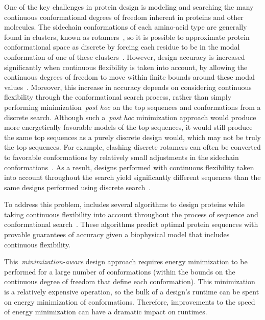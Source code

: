 One of the key challenges in protein design is modeling and searching the many continuous conformational degrees of freedom inherent in proteins and other molecules. The sidechain conformations of each amino-acid type are generally found in clusters, known as rotamers~\cite{rotamers}, so it is possible to approximate protein conformational space as discrete by forcing each residue to be in the modal conformation of one of these clusters~\cite{DEE,DEE/A*}.  However, design accuracy is increased significantly when continuous flexibility is taken into account, by allowing the continuous degrees of freedom to move within finite bounds around these modal values~\cite{iMinDEE,DEEPer,OSPREY_MIE,BBK*}.  Moreover, this increase in accuracy depends on considering continuous flexibility through the conformational search process, rather than simply performing minimization~\textit{post hoc} on the top sequences and conformations from a discrete search.  Although such a~\textit{post hoc} minimization approach would produce more energetically favorable models of the top sequences, it would still produce the same top sequences as a purely discrete design would, which may not be truly the top sequences.  For example, clashing discrete rotamers can often be converted to favorable conformations by relatively small adjustments in the sidechain conformations~\cite{minDEE,iMinDEE,DEEPer,CATS}.  As a result, designs performed with continuous flexibility taken into account throughout the search yield significantly different sequences than the same designs performed using discrete search~\cite{iMinDEE,DEEPer,OSPREY_MIE}.  

To address this problem, \osprey includes several algorithms to design proteins while taking continuous flexibility into account throughout the process of sequence and conformational search~\cite{minDEE,iMinDEE,DEEPer,EPIC,LUTE_RECOMB,CATS}.   These algorithms predict optimal protein sequences with provable guarantees of accuracy given a biophysical model that includes continuous flexibility.  

This~\textit{minimization-aware} design approach requires energy minimization to be performed for a large number of conformations (within the bounds on the continuous degree of freedom that define each conformation).  This minimization is a relatively expensive operation, so the bulk of a design's runtime can be spent on energy minimization of conformations. Therefore, improvements to the speed of energy minimization can have a dramatic impact on \osprey runtimes.  

